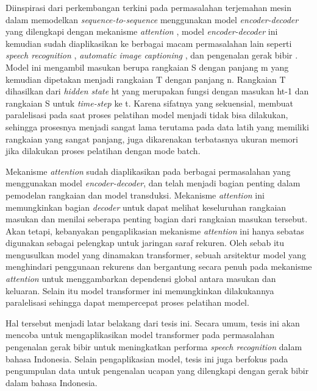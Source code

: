 Diinspirasi dari perkembangan terkini pada permasalahan terjemahan mesin dalam memodelkan \textit{sequence-to-sequence} menggunakan model \textit{encoder-decoder} yang dilengkapi dengan mekanisme \textit{attention} \parencite{Bahdanau2015}, model \textit{encoder-decoder} ini kemudian sudah diaplikasikan ke berbagai macam permasalahan lain seperti \textit{speech recognition} \parencite{Chan2015}, \textit{automatic image captioning} \parencite{Vinyals2014} \parencite{Xu2015}, dan pengenalan gerak bibir \parencite{Chung2017}. Model ini mengambil masukan berupa rangkaian S dengan panjang m yang kemudian dipetakan menjadi rangkaian T dengan panjang n. Rangkaian T dihasilkan dari \textit{hidden state} ht yang merupakan fungsi dengan masukan ht-1 dan rangkaian S untuk \textit{time-step} ke t. Karena sifatnya yang sekuensial, membuat paralelisasi pada saat proses pelatihan model menjadi tidak bisa dilakukan, sehingga prosesnya menjadi sangat lama terutama pada data latih yang memiliki rangkaian yang sangat panjang, juga dikarenakan terbatasnya ukuran memori jika dilakukan proses pelatihan dengan mode batch.
\bigskip

Mekanisme \textit{attention} sudah diaplikasikan pada berbagai permasalahan yang menggunakan model \textit{encoder-decoder}, dan telah menjadi bagian penting dalam pemodelan rangkaian dan model transduksi. Mekanisme \textit{attention} ini memungkinkan bagian \textit{decoder} untuk dapat melihat keseluruhan rangkaian masukan dan menilai seberapa penting bagian dari rangkaian masukan tersebut. Akan tetapi, kebanyakan pengaplikasian mekanisme \textit{attention} ini hanya sebatas digunakan sebagai pelengkap untuk jaringan saraf rekuren. Oleh sebab itu \textcite{Vaswani2017} mengusulkan model yang dinamakan transformer, sebuah arsitektur model yang menghindari penggunaan rekurens dan bergantung secara penuh pada mekanisme \textit{attention} untuk menggambarkan dependensi global antara masukan dan keluaran. Selain itu model transformer ini memungkinkan dilakukannya paralelisasi sehingga dapat mempercepat proses pelatihan model.
\bigskip

Hal tersebut menjadi latar belakang dari tesis ini. Secara umum, tesis ini akan mencoba untuk mengaplikasikan model transformer pada permasalahan pengenalan gerak bibir untuk meningkatkan performa \textit{speech recognition} dalam bahasa Indonesia. Selain pengaplikasian model, tesis ini juga berfokus pada pengumpulan data untuk pengenalan ucapan yang dilengkapi dengan gerak bibir dalam bahasa Indonesia.


